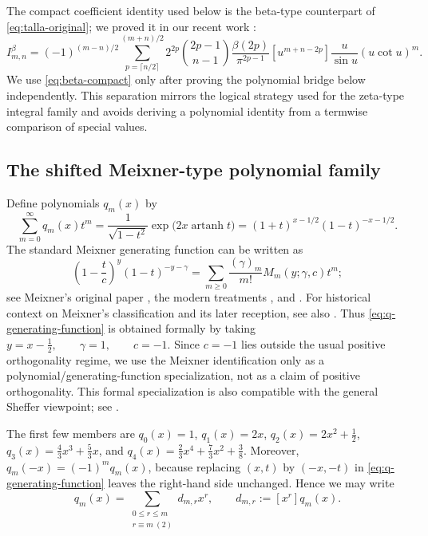 \documentclass[11pt,twoside]{article}
\begin{document}
The compact coefficient identity used below is the beta-type counterpart
of \eqref{eq:talla-original}; we proved it in our recent work
\cite{TallaWaffo2026BetaAnalogues}:
\begin{equation}
\label{eq:beta-compact}
\boxed{
I_{m,n}^{\beta}
=
(-1)^{(m-n)/2}
\sum_{p=\lceil n/2\rceil}^{(m+n)/2}
2^{2p}\binom{2p-1}{n-1}
\frac{\beta(2p)}{\pi^{2p-1}}
[u^{m+n-2p}]
\frac{u}{\sin u}(u\cot u)^m.
}
\end{equation}
We use \eqref{eq:beta-compact} only after proving the polynomial bridge
below independently.  This separation mirrors the logical strategy used
for the zeta-type integral family and avoids deriving a polynomial identity
from a termwise comparison of special values.

\subsection{The shifted Meixner-type polynomial family}

Define polynomials $q_m(x)$ by
\begin{equation}
\label{eq:q-generating-function}
\boxed{
\sum_{m=0}^{\infty}q_m(x)t^m
=
\frac{1}{\sqrt{1-t^2}}
\exp\!\bigl(2x\operatorname{artanh}t\bigr)
=
(1+t)^{x-1/2}(1-t)^{-x-1/2}.
}
\end{equation}
The standard Meixner generating function can be written as
\[
\left(1-\frac{t}{c}\right)^y(1-t)^{-y-\gamma}
=
\sum_{m\ge0}\frac{(\gamma)_m}{m!}
M_m(y;\gamma,c)t^m;
\]
see Meixner's original paper \cite{Meixner1934}, the modern treatments
\cite{Ismail2009,KoekoekLeskySwarttouw2010}, and
\cite[Sec.~18.23]{NIST:DLMF}.  For historical context on Meixner's
classification and its later reception, see also \cite{ButzerKoornwinder2019}.
Thus
\eqref{eq:q-generating-function} is obtained formally by taking
\(y=x-\frac12,\qquad \gamma=1,\qquad c=-1\).
Since $c=-1$ lies outside the usual positive orthogonality regime, we
use the Meixner identification only as a polynomial/generating-function
specialization, not as a claim of positive orthogonality.  This formal
specialization is also compatible with the general Sheffer viewpoint;
see \cite{Sheffer1939,RotaKahanerOdlyzko1973,Roman1984,NIST:DLMF}.

The first few members are \(q_0(x)=1\), \(q_1(x)=2x\), \(q_2(x)=2x^2+\frac12\), \(q_3(x)=\frac43x^3+\frac53x\), and \(q_4(x)=\frac23x^4+\frac73x^2+\frac38\).
Moreover,
\(q_m(-x)=(-1)^m q_m(x)\),
because replacing $(x,t)$ by $(-x,-t)$ in
\eqref{eq:q-generating-function} leaves the right-hand side unchanged.
Hence we may write
\begin{equation}
\label{eq:q-expansion}
q_m(x)=
\sum_{\substack{0\le r\le m\\r\equiv m\ (2)}}d_{m,r}x^r,
\qquad
d_{m,r}:=[x^r]q_m(x).
\end{equation}
\end{document}
